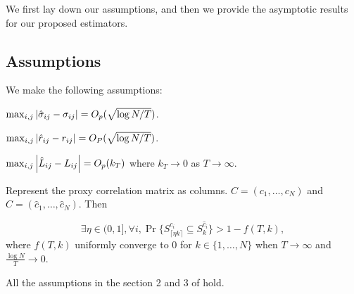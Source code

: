 We first lay down our assumptions, and then we provide the asymptotic results for our proposed estimators.
\subsection{Assumptions}
We make the following assumptions:
\begin{assu}
    \( \max_{i,j} \abs{\hat{\sigma}_{ij} - \sigma_{ij}} = O_{p}(\sqrt{\log N / T}) \). 
    \label{Gaussian asmp}
\end{assu}
\begin{assu}
	$\max_{i,j} \abs{ \hat{r}_{ij} - r_{ij} } = O_P(\sqrt{ \log N / T })$.
    \label{Gaussian asmp cor}
\end{assu}
\begin{assu}
    \( \max_{i,j} \abs{\hat{L}_{ij} - L_{ij}} = O_{p}(k_{T})\) where \(k_{T} \to 0\) as \(T \to \infty\).
    \label{asmp:framework1}
\end{assu}
\begin{assu}
    Represent the proxy correlation matrix as columns. $C=(c_1, \dots , c_N)$ and $\hat C = (\hat{c}_1, \dots, \hat{c}_N)$. Then
    \iffalse
    \begin{equation*}
        \exists \eta \in (0, 1], \forall i, \forall k, \lim_{T\to\infty} \Pr \{  S_{\eta k}^{c_i} \subseteq S_k^{ \hat{c}_i}  \} = 1.
    \end{equation*}
    \fi
    \begin{equation*}
        \exists \eta \in (0, 1], \forall i, \Pr \{ S^{c_i}_{\lceil \eta k \rceil} \subseteq S^{ \hat{c}_i}_k \} > 1 - f(T, k),
    \end{equation*}
    where $f(T, k)$ uniformly converge to $0$ for $k \in \{1, \dots, N\}$ when $T \to \infty$ and $\frac{\log N}{T} \to 0$.
    \label{asmp:framework2}
\end{assu}

\begin{assu}
    All the assumptions in the section 2 and 3 of \cite{fanHighDimensionalCovarianceMatrix2011} hold. 
\end{assu}

